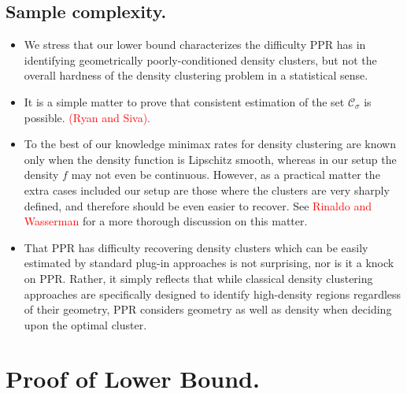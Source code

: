 \documentclass[11pt,twoside]{article}
\newcommand{\1}{\mathbf{1}}
\newcommand{\Cset}{\mathcal{C}}
\newcommand{\Csig}{\Cset_{\sigma}}
\begin{document}
\subsection{Sample complexity.}

\begin{itemize}
	\item We stress that our lower bound characterizes the difficulty PPR has in identifying geometrically poorly-conditioned density clusters, but not the overall hardness of the density clustering problem in a statistical sense. 
	\item It is a simple matter to prove that consistent estimation of the set $\Csig$ is possible. \textcolor{red}{(Ryan and Siva).}
	\item To the best of our knowledge minimax rates for density clustering are known only when the density function is Lipschitz smooth, whereas in our setup the density $f$ may not even be continuous. However, as a practical matter the extra cases included our setup are those where the clusters are very sharply defined, and therefore should be even easier to recover. See \textcolor{red}{Rinaldo and Wasserman} for a more thorough discussion on this matter.
	\item That PPR has difficulty recovering density clusters which can be easily estimated by standard plug-in approaches is not surprising, nor is it a knock on PPR. Rather, it simply reflects that while classical density clustering approaches are specifically designed to identify high-density regions regardless of their geometry, PPR considers geometry as well as density when deciding upon the optimal cluster.
\end{itemize}



\clearpage


\section{Proof of Lower Bound.}
\end{document}
